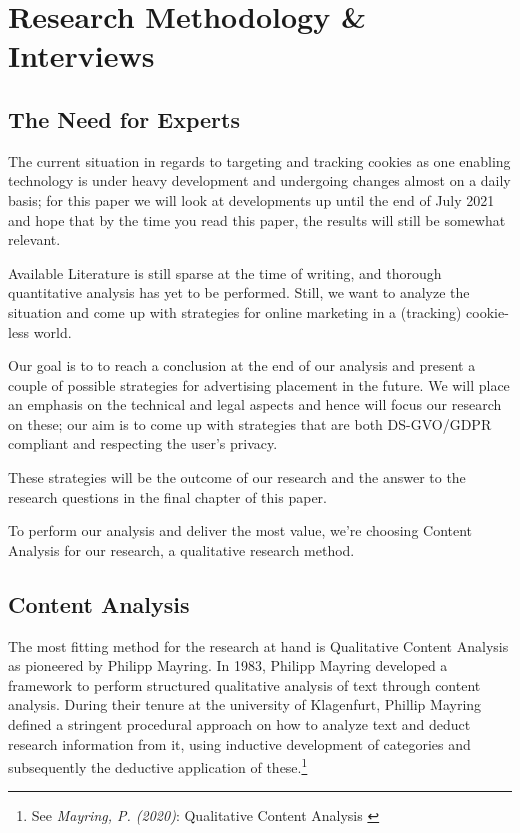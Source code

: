 %
%

\pagebreak
\section{Research Methodology \& Interviews}

\onehalfspacing

\subsection{The Need for Experts}

The current situation in regards to targeting and tracking cookies as one enabling technology is under heavy development and undergoing changes almost on a daily basis; for this paper we will look at developments up until the end of July 2021 and hope that by the time you read this paper, the results will still be somewhat relevant.

Available Literature is still sparse at the time of writing, and thorough quantitative analysis has yet to be performed. Still, we want to analyze the situation and come up with strategies for online marketing in a (tracking) cookie-less world.

Our goal is to to reach a conclusion at the end of our analysis and present a couple of possible strategies for advertising placement in the future. We will place an emphasis on the technical and legal aspects and hence will focus our research on these; our aim is to come up with strategies that are both DS-GVO/GDPR compliant and respecting the user's privacy.

These strategies will be the outcome of our research and the answer to the research questions in the final chapter of this paper.

To perform our analysis and deliver the most value, we're choosing Content Analysis for our research, a qualitative research method.

\subsection{Content Analysis}

The most fitting method for the research at hand is Qualitative Content Analysis as pioneered by Philipp Mayring. In 1983, Philipp Mayring developed a framework to perform structured qualitative analysis of text through content analysis. During their tenure at the university of Klagenfurt, Phillip Mayring defined a stringent procedural approach on how to analyze text and deduct research information from it, using inductive development of categories and subsequently the deductive application of these.\footnote{See \textit{Mayring, P. (2020)}: Qualitative Content Analysis \cite{qualiContent}}

